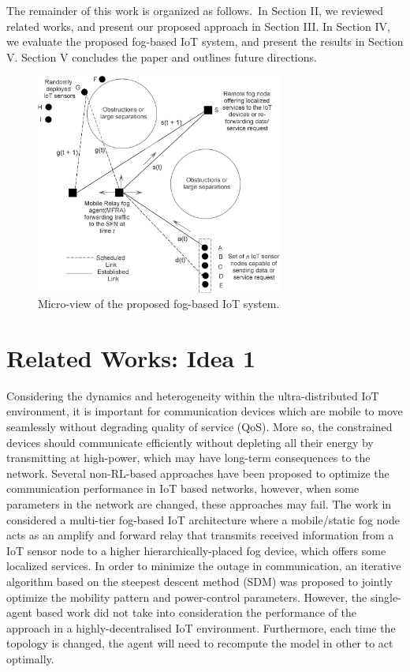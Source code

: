 \documentclass[journal]{IEEEtran}
\begin{document}
The remainder of this work is organized as follows.~In Section II, we reviewed related works, and present our proposed approach in Section III. In Section IV, we evaluate the proposed fog-based IoT system, and present the results in Section V. Section V concludes the paper and outlines future directions. 





\begin{figure}[!t]
\centering
\includegraphics[width=3.2in]{ideafig1.eps}
\caption{Micro-view of the proposed fog-based IoT system.}
\label{ideafig1}
\end{figure}


\section{Related Works: Idea 1}
Considering the dynamics and heterogeneity within the ultra-distributed IoT environment, it is important for communication devices which are mobile to move seamlessly without degrading quality of service (QoS). More so, the constrained devices should communicate efficiently without depleting all their energy by transmitting at high-power, which may have long-term consequences to the network. Several non-RL-based approaches have been proposed to optimize the communication performance in IoT based networks, however, when some parameters in the network are changed, these approaches may fail.
The work in~\cite{OmoniwaRelay2018} considered a multi-tier fog-based IoT architecture where a mobile/static fog node acts as an amplify and forward relay that transmits received information from a IoT sensor node to a higher hierarchically-placed fog device, which offers some localized services. In order to minimize the outage in communication, an iterative algorithm based on the steepest descent method (SDM) was proposed to jointly optimize the mobility pattern and power-control parameters. However, the single-agent based work did not take into consideration the performance of the approach in a highly-decentralised IoT environment. Furthermore, each time the topology is changed, the agent will need to recompute the model in other to act optimally.
\end{document}
